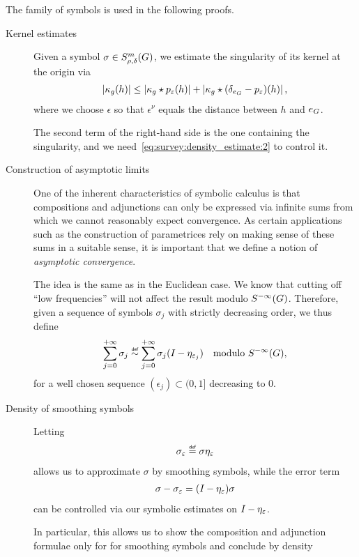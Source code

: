 The family of symbols is used in the following proofs.
\begin{description}
    \item[Kernel estimates]

        Given a symbol $\sigma \in S^{m}_{\rho, \delta}(G)$,
        we estimate the singularity of its kernel at the origin via
        \begin{align*}
            \left|{\kappa_g(h)}\right|
            \leq
            \left|{\kappa_g \star p_\varepsilon(h)}\right|
            +
            \left|{\kappa_g \star (\delta_{e_G} - p_\varepsilon)(h)}\right|,
        \end{align*}
        where we choose $\epsilon$ so that $\epsilon^\nu$ equals the distance between $h$ and $e_G$.

        The second term of the right-hand side is the one containing the singularity,
        and we need~\eqref{eq:survey:density_estimate:2} to control it.

    \item[Construction of asymptotic limits]

        One of the inherent characteristics of symbolic calculus is that compositions and adjunctions can only be expressed via infinite sums from which we cannot reasonably expect convergence.
        As certain applications such as the construction of parametrices rely on making sense of these sums in a suitable sense,
        it is important that we define a notion of \emph{asymptotic convergence}.

        The idea is the same as in the Euclidean case.
        We know that cutting off ``low frequencies'' will not affect the result modulo ${S^{-\infty} (G)}$.
        Therefore, given a sequence of symbols $\sigma_j$ with strictly decreasing order,
        we thus define
        \begin{align*}
            \sum_{j = 0}^{+\infty} \sigma_j \defsim
            \sum_{j = 0}^{+\infty} \sigma_j (\Id {} - \eta_{\epsilon_j})
            \quad \text{modulo } \SmoothingSymbols,
        \end{align*}
        for a well chosen sequence $(\epsilon_j) \subset (0, 1]$ decreasing to $0$.

    \item[Density of smoothing symbols]

        Letting
        \begin{align*}
            \sigma_\epsilon \defeq \sigma \eta_\epsilon
        \end{align*}
        allows us to approximate $\sigma$ by smoothing symbols,
        while the error term
        \begin{align*}
            \sigma - \sigma_\varepsilon = ({I_{}} - \eta_\varepsilon) \sigma
        \end{align*}
        can be controlled via our symbolic estimates on ${I_{}} - \eta_\varepsilon$.

        In particular,
        this allows us to show the composition and adjunction formulae only for
        for smoothing symbols and conclude by density
\end{description}


